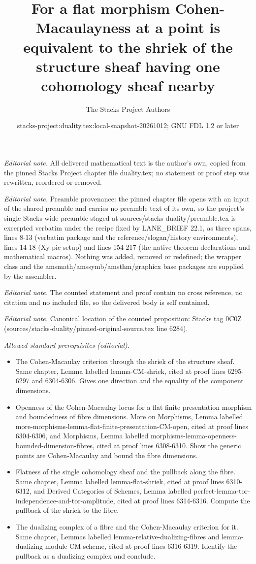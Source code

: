 \documentclass[10pt,a4paper]{amsart}
\title{For a flat morphism Cohen-Macaulayness at a point is equivalent to the shriek of the structure sheaf having one cohomology sheaf nearby}
\author{The Stacks Project Authors}
\date{stacks-project:duality.tex:local-snapshot-20261012; GNU FDL 1.2 or later}
\theoremstyle{plain}
\theoremstyle{definition}
\theoremstyle{remark}
\numberwithin{equation}{subsection}
\begin{document}
\maketitle
\noindent\textit{Editorial note.} All delivered mathematical text is the author's own, copied from the pinned Stacks Project chapter file duality.tex; no statement or proof step was rewritten, reordered or removed.\par\medskip
\noindent\textit{Editorial note.} Preamble provenance: the pinned chapter file opens with an input of the shared preamble and carries no preamble text of its own, so the project's single Stacks-wide preamble staged at sources/stacks-duality/preamble.tex is excerpted verbatim under the recipe fixed by LANE\_BRIEF 22.1, as three spans, lines 8-13 (verbatim package and the reference/slogan/history environments), lines 14-18 (Xy-pic setup) and lines 154-217 (the native theorem declarations and mathematical macros). Nothing was added, removed or redefined; the wrapper class and the amsmath/amssymb/amsthm/graphicx base packages are supplied by the assembler.\par\medskip
\noindent\textit{Editorial note.} The counted statement and proof contain no cross reference, no citation and no included file, so the delivered body is self contained.\par\medskip
\noindent\textit{Editorial note.} Canonical location of the counted proposition: Stacks tag 0C0Z (sources/stacks-duality/pinned-original-source.tex line 6284).\par\medskip
\noindent\textit{Allowed standard prerequisites (editorial).}\begin{itemize}
\item The Cohen-Macaulay criterion through the shriek of the structure sheaf. Same chapter, Lemma labelled lemma-CM-shriek, cited at proof lines 6295-6297 and 6304-6306. Gives one direction and the equality of the component dimensions.
\item Openness of the Cohen-Macaulay locus for a flat finite presentation morphism and boundedness of fibre dimensions. More on Morphisms, Lemma labelled more-morphisms-lemma-flat-finite-presentation-CM-open, cited at proof lines 6304-6306, and Morphisms, Lemma labelled morphisms-lemma-openness-bounded-dimension-fibres, cited at proof lines 6308-6310. Show the generic points are Cohen-Macaulay and bound the fibre dimensions.
\item Flatness of the single cohomology sheaf and the pullback along the fibre. Same chapter, Lemma labelled lemma-flat-shriek, cited at proof lines 6310-6312, and Derived Categories of Schemes, Lemma labelled perfect-lemma-tor-independence-and-tor-amplitude, cited at proof lines 6314-6316. Compute the pullback of the shriek to the fibre.
\item The dualizing complex of a fibre and the Cohen-Macaulay criterion for it. Same chapter, Lemmas labelled lemma-relative-dualizing-fibres and lemma-dualizing-module-CM-scheme, cited at proof lines 6316-6319. Identify the pullback as a dualizing complex and conclude.
\end{itemize}\medskip
\end{document}
